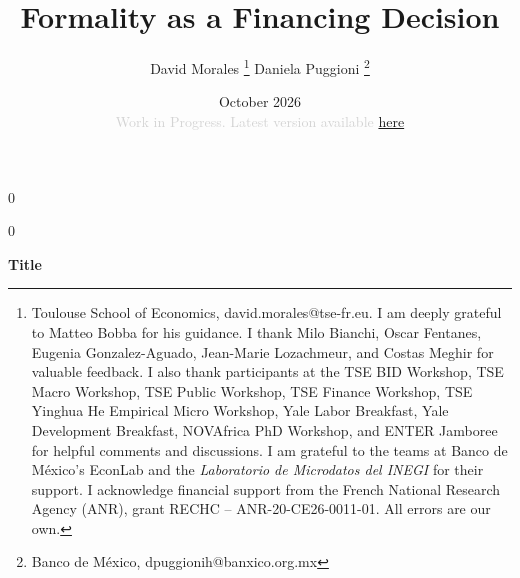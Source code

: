 \documentclass[12pt]{article}
\newcommand{\blind}{0}
\begin{document}


\def\spacingset#1{\renewcommand{\baselinestretch}
{#1}\small\normalsize} \spacingset{1}



\blind
{
    \title{\bf Formality as a Financing Decision}
  \author{David Morales \thanks{Toulouse School of Economics, david.morales@tse-fr.eu. I am deeply grateful to Matteo Bobba for his guidance. I thank Milo Bianchi, Oscar Fentanes, Eugenia Gonzalez-Aguado, Jean-Marie Lozachmeur, and Costas Meghir for valuable feedback. I also thank participants at the TSE BID Workshop, TSE Macro Workshop, TSE Public Workshop, TSE Finance Workshop, TSE Yinghua He Empirical Micro Workshop, Yale Labor Breakfast, Yale Development Breakfast, NOVAfrica PhD Workshop, and ENTER Jamboree for helpful comments and discussions. I am grateful to the teams at Banco de México's EconLab and the \textit{Laboratorio de Microdatos del INEGI} for their support. I acknowledge financial support from the French National Research Agency (ANR), grant RECHC -- ANR-20-CE26-0011-01. All errors are our own.} \quad Daniela Puggioni \thanks{Banco de México, dpuggionih@banxico.org.mx}}
  \date{October 2026 \\
  \vspace{3mm}
  \textcolor{lightgray}{Work in Progress. Latest version available
    \href{https://davidsmorales.github.io/files/FinancialFrictions.pdf}{here}%
  }%
}
\maketitle
} \fi

\blind
{
  \bigskip
  \bigskip
  \bigskip
  \begin{center}
    {\LARGE\bf Title}
\end{center}
  \medskip
} \fi

\bigskip
\end{document}
